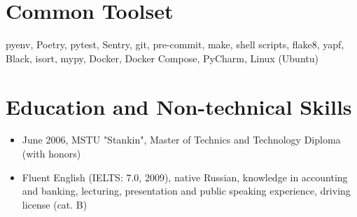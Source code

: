 \documentclass[a4paper,8pt]{extarticle}
\begin{document}
\section*{\hypertarget{common-toolset}{Common Toolset}}
pyenv, Poetry, pytest, Sentry, git, pre-commit, make, shell scripts, flake8, yapf, Black, isort, mypy, Docker, Docker Compose, PyCharm, Linux (Ubuntu)

\section*{Education and Non-technical Skills}
\begin{itemize}
    \item June 2006, MSTU "Stankin", Master of Technics and Technology Diploma (with honors)
    \item Fluent English (IELTS: 7.0, 2009), native Russian, knowledge in accounting and banking, lecturing, presentation and public speaking experience, driving license (cat. B)
\end{itemize}
\end{document}
